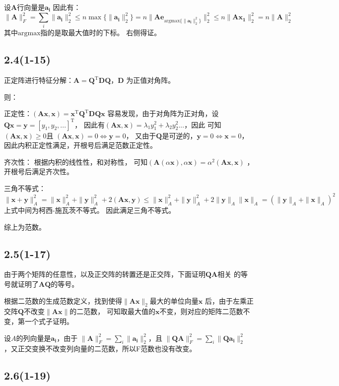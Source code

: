 \documentclass[UTF8,zihao=5]{ctexart}
\newcommand{\bm}[1]{{\mathbf{#1}}}
\newcommand{\trans}[0]{^\mathrm{T}}
\begin{document}
设$\bm{A}$行向量是$\bm{a_i}$
因此有：
$$
\|\bm{A}\|_F^2=\sum_i{\|\bm{a_i}\|_2^2}
\leq n \max{\{\|\bm{a_i}\|_2^2\}}
=n\|\bm{A}\bm{e}_{\mathrm{argmax}\{\|\bm{a_i}\|_2^2\}}\|_2^2
\leq n\|\bm{A}\bm{x_1}\|_2^2
=n\|\bm{A}\|_2^2
$$
其中$\mathrm{argmax}$指的是取最大值时的下标。
右侧得证。

\subsection*{2.4(1-15)}

正定阵进行特征分解：$\bm{A}=\bm{Q}\trans\bm{DQ}$，$\bm{D}$
为正值对角阵。

则：

正定性：$(\bm{Ax},\bm{x})=\bm{x}\trans\bm{Q}\trans\bm{DQx}$
容易发现，由于对角阵为正对角，设$\bm{Qx}=\bm{y}=[y_1,y_2,...]\trans$，
因此有$(\bm{Ax},\bm{x})=\lambda_1y_1^2+\lambda_2y_2^2...$，因此
可知$(\bm{Ax},\bm{x})\geq 0 $且
$(\bm{Ax},\bm{x})=0 \Leftrightarrow \bm{y}=0 $，
又由于$\bm{Q}$是可逆的，$\bm{y}=0\Leftrightarrow\bm{x}=0$，
因此内积正定性满足，开根号后满足范数正定性。


齐次性：
根据内积的线性性，和对称性，
可知$(\bm{A}(\alpha \bm{x}),\alpha\bm{x})=\alpha^2(\bm{Ax},\bm{x})$
，开根号后满足齐次性。

三角不等式：
$$
\|\bm{x+y}\|^2_A=\|\bm{x}\|^2_A+\|\bm{y}\|^2_A+2(\bm{Ax},\bm{y})
\leq\|\bm{x}\|^2_A+\|\bm{y}\|^2_A+2\|\bm{y}\|_A\|\bm{x}\|_A
=(\|\bm{y}\|_A+\|\bm{x}\|_A)^2
$$
上式中间为柯西-施瓦茨不等式。
因此满足三角不等式。

综上为范数。

\subsection*{2.5(1-17)}

由于两个矩阵的任意性，以及正交阵的转置还是正交阵，下面证明$\bm{QA}$相关
的等号就证明了$\bm{AQ}$的等号。

根据二范数的生成范数定义，找到使得$\|\bm{Ax}\|_2$最大的单位向量$\bm{x}$
后，由于左乘正交阵$\bm{Q}$不改变$\|\bm{Ax}\|$的二范数，
可知取最大值的$\bm{x}$不变，则对应的矩阵二范数不变，第一个式子证明。

设$A$的列向量是$\bm{a_i}$，由于
$\|\bm{A}\|_F^2=\sum_i\|\bm{a_i}\|_2^2$，且
$\|\bm{QA}\|_F^2=\sum_i\|\bm{Qa_i}\|_2^2$
，又正交变换不改变列向量的二范数，所以F范数也没有改变。

\subsection*{2.6(1-19)}
\end{document}
